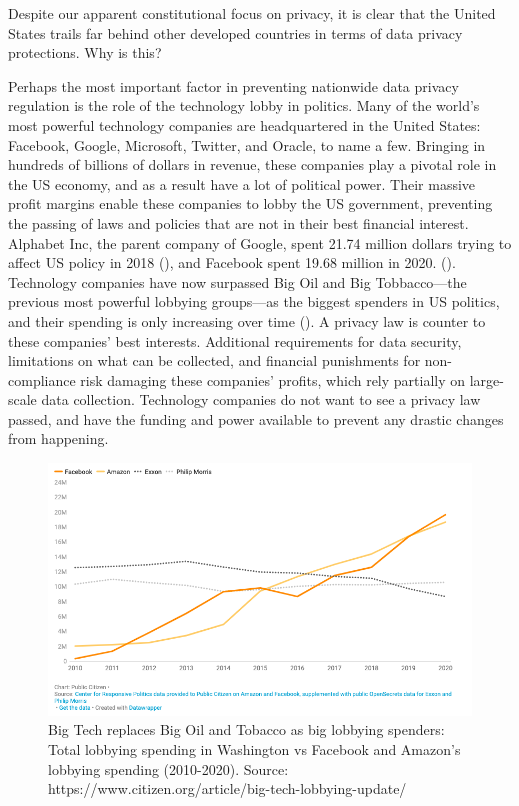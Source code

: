 \documentclass[water,article,submit,moreauthors,pdftex]{mdpi}
\begin{document}
Despite our apparent constitutional focus on privacy, it is clear that
the United States trails far behind other developed countries in terms
of data privacy protections. Why is this?

Perhaps the most important factor in preventing nationwide data privacy
regulation is the role of the technology lobby in politics. Many of the
world's most powerful technology companies are headquartered in the
United States: Facebook, Google, Microsoft, Twitter, and Oracle, to name
a few. Bringing in hundreds of billions of dollars in revenue, these
companies play a pivotal role in the US economy, and as a result have a
lot of political power. Their massive profit margins enable these
companies to lobby the US government, preventing the passing of laws and
policies that are not in their best financial interest. Alphabet Inc,
the parent company of Google, spent 21.74 million dollars trying to
affect US policy in 2018 (\citet{tech-lobby}), and Facebook spent 19.68
million in 2020. (\citet{citizen-tech}). Technology companies have now
surpassed Big Oil and Big Tobbacco---the previous most powerful lobbying
groups---as the biggest spenders in US politics, and their spending is
only increasing over time (\citet{citizen-tech}). A privacy law is
counter to these companies' best interests. Additional requirements for
data security, limitations on what can be collected, and financial
punishments for non-compliance risk damaging these companies' profits,
which rely partially on large-scale data collection. Technology
companies do not want to see a privacy law passed, and have the funding
and power available to prevent any drastic changes from happening.

\begin{figure}[H]
\includegraphics[width=1\linewidth]{lobby-notitle} \caption{Big Tech replaces Big Oil and Tobacco as big lobbying spenders: Total lobbying spending in Washington vs Facebook and Amazon's lobbying spending (2010-2020). Source: https://www.citizen.org/article/big-tech-lobbying-update/}\label{fig:unnamed-chunk-1}
\end{figure}
\end{document}
